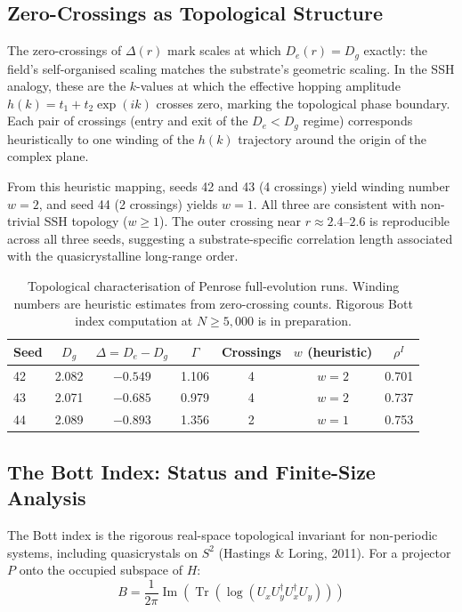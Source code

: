 \documentclass[11pt,a4paper]{article}
\begin{document}
\subsection{Zero-Crossings as Topological Structure}

The zero-crossings of $\Delta(r)$ mark scales at which $D_e(r) = D_g$ exactly: the field's self-organised scaling matches the substrate's geometric scaling. In the SSH analogy, these are the $k$-values at which the effective hopping amplitude $h(k) = t_1 + t_2 \exp(ik)$ crosses zero, marking the topological phase boundary. Each pair of crossings (entry and exit of the $D_e < D_g$ regime) corresponds heuristically to one winding of the $h(k)$ trajectory around the origin of the complex plane.

From this heuristic mapping, seeds 42 and 43 (4 crossings) yield winding number $w = 2$, and seed 44 (2 crossings) yields $w = 1$. All three are consistent with non-trivial SSH topology ($w \geq 1$). The outer crossing near $r \approx 2.4$--$2.6$ is reproducible across all three seeds, suggesting a substrate-specific correlation length associated with the quasicrystalline long-range order.

\begin{table}[htbp]
\centering
\begin{tabular}{lcccccc}
\toprule
\textbf{Seed} & \textbf{$D_g$} & \textbf{$\Delta = D_e - D_g$} & \textbf{$\Gamma$} & \textbf{Crossings} & \textbf{$w$ (heuristic)} & \textbf{$\rho^I$} \\
\midrule
42 & 2.082 & $-0.549$ & 1.106 & 4 & $w = 2$ & 0.701 \\
43 & 2.071 & $-0.685$ & 0.979 & 4 & $w = 2$ & 0.737 \\
44 & 2.089 & $-0.893$ & 1.356 & 2 & $w = 1$ & 0.753 \\
\bottomrule
\end{tabular}
\caption{Topological characterisation of Penrose full-evolution runs. Winding numbers are heuristic estimates from zero-crossing counts. Rigorous Bott index computation at $N \geq 5{,}000$ is in preparation.}
\end{table}

\subsection{The Bott Index: Status and Finite-Size Analysis}

The Bott index is the rigorous real-space topological invariant for non-periodic systems, including quasicrystals on $S^2$ (Hastings \& Loring, 2011). For a projector $P$ onto the occupied subspace of $H$:
\begin{equation}
B = \frac{1}{2\pi} \operatorname{Im}(\operatorname{Tr}(\log(U_x U_y^\dagger U_x^\dagger U_y)))
\end{equation}
\end{document}
